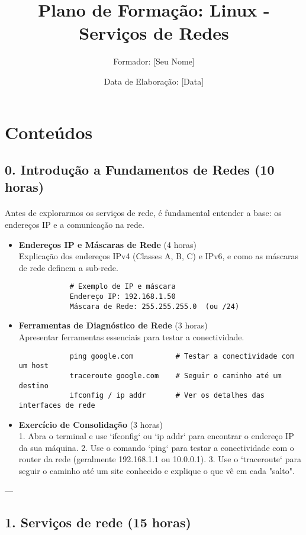 \documentclass[10pt,a4paper]{article}
\title{Plano de Formação: Linux - Serviços de Redes}
\author{Formador: [Seu Nome]}
\date{Data de Elaboração: [Data]}
\begin{document}
	
	\section*{Conteúdos}
	
	\subsection*{0. Introdução a Fundamentos de Redes (10 horas)}
	\vspace{-1.2em}
	\paragraph{}
	Antes de explorarmos os serviços de rede, é fundamental entender a base: os endereços IP e a comunicação na rede.
	
	\begin{itemize}
		\item \textbf{Endereços IP e Máscaras de Rede} (4 horas) \\
		Explicação dos endereços IPv4 (Classes A, B, C) e IPv6, e como as máscaras de rede definem a sub-rede.
		\begin{verbatim}
			# Exemplo de IP e máscara
			Endereço IP: 192.168.1.50
			Máscara de Rede: 255.255.255.0  (ou /24)
		\end{verbatim}
		
		\item \textbf{Ferramentas de Diagnóstico de Rede} (3 horas) \\
		Apresentar ferramentas essenciais para testar a conectividade.
		\begin{verbatim}
			ping google.com          # Testar a conectividade com um host
			traceroute google.com    # Seguir o caminho até um destino
			ifconfig / ip addr       # Ver os detalhes das interfaces de rede
		\end{verbatim}
		
		\item \textbf{Exercício de Consolidação} (3 horas) \\
		1. Abra o terminal e use `ifconfig` ou `ip addr` para encontrar o endereço IP da sua máquina.
		2. Use o comando `ping` para testar a conectividade com o router da rede (geralmente 192.168.1.1 ou 10.0.0.1).
		3. Use o `traceroute` para seguir o caminho até um site conhecido e explique o que vê em cada "salto".
	\end{itemize}
	
	---
	
	\subsection*{1. Serviços de rede (15 horas)}
	\vspace{-1.2em}
\end{document}
